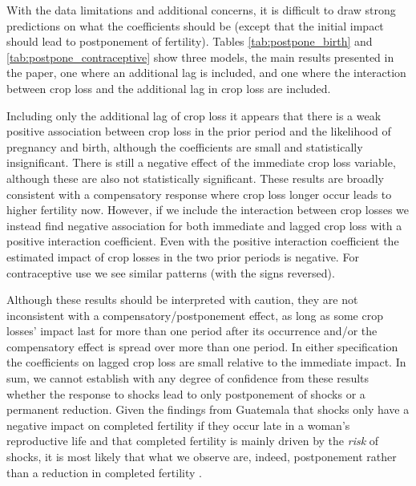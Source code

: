 \documentclass[letterpaper,12pt]{article}
\begin{document}




With the data limitations and additional concerns,
it is difficult to draw strong predictions on what the coefficients
should be (except that the initial impact should lead to postponement 
of fertility).
Tables \ref{tab:postpone_birth} and \ref{tab:postpone_contraceptive}
show three models, the main results presented in the paper, one
where an additional lag is included, and one where the interaction
between crop loss and the additional lag in crop loss are included.

Including only the additional lag of crop loss it appears that 
there is a weak positive association between crop loss in the prior
period and the likelihood of pregnancy and birth, although the 
coefficients are small and statistically insignificant.
There is still a negative effect of the immediate crop loss
variable, although these are also not statistically significant.
These results are broadly consistent with a compensatory response
where crop loss longer occur leads to higher fertility now.
However, if we include the interaction between crop losses we 
instead find negative association for both immediate and lagged 
crop loss with a positive interaction coefficient.
Even with the positive interaction coefficient the estimated 
impact of crop losses in the two prior periods is negative.
For contraceptive use we see similar patterns (with the signs 
reversed).

Although these results should be interpreted with caution, they
are not inconsistent with a compensatory/postponement effect, 
as long as some crop losses' impact last for more than one
period after its occurrence and/or the compensatory effect is
spread over more than one period.
In either specification the coefficients on lagged crop loss
are small relative to the immediate impact.
In sum, we cannot establish with any degree of confidence from
these results whether the response to shocks lead to only postponement 
of shocks or a permanent reduction.
Given the findings from Guatemala that shocks only 
have a negative impact on completed fertility if they occur
late in a woman's reproductive life and that completed 
fertility is mainly driven by the \emph{risk} of shocks,
it is most likely that what we observe are, indeed, postponement
rather than a reduction in completed fertility \citep{Portner2014}.

\end{document}
